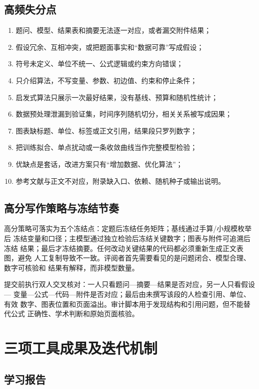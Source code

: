 \documentclass[UTF8,a4paper,12pt]{ctexart}
\begin{document}
\subsection{高频失分点}

\begin{enumerate}
  \item 题问、模型、结果表和摘要无法逐一对应，或者漏交附件结果；
  \item 假设冗余、互相冲突，或把题面事实和“数据可靠”写成假设；
  \item 符号未定义、单位不统一、公式逻辑或约束方向错误；
  \item 只介绍算法，不写变量、参数、初边值、约束和停止条件；
  \item 启发式算法只展示一次最好结果，没有基线、预算和随机性统计；
  \item 数据预处理泄漏到验证集，时间序列随机切分，相关关系被写成因果；
  \item 图表缺标题、单位、标签或正文引用，结果段只罗列数字；
  \item 把训练拟合、单点扰动或一条收敛曲线当作完整模型检验；
  \item 优缺点是套话，改进方案只有“增加数据、优化算法”；
  \item 参考文献与正文不对应，附录缺入口、依赖、随机种子或输出说明。
\end{enumerate}

\subsection{高分写作策略与冻结节奏}

高分策略可落实为五个冻结点：定题后冻结任务矩阵；基线通过手算/小规模枚举后
冻结变量和口径；主模型通过独立检验后冻结关键数字；图表与附件可追溯后冻结
结果；最后才冻结摘要。任何改动关键结果的代码都必须重新生成正文表图，避免
人工复制导致不一致。评阅者首先需要看见的是问题闭合、模型合理、数字可核验和
结果有解释，而非模型数量。

提交前执行双人交叉核对：一人只看题问—摘要—结果是否对应，另一人只看假设—
变量—公式—代码—附件是否对应；最后由未撰写该段的人检查引用、单位、有效
数字、图表位置和页面溢出。审计脚本用于发现结构和引用问题，但不能替代公式
正确性、学术判断和原始页面核验。

\section{三项工具成果及迭代机制}

\subsection{学习报告}
\end{document}
